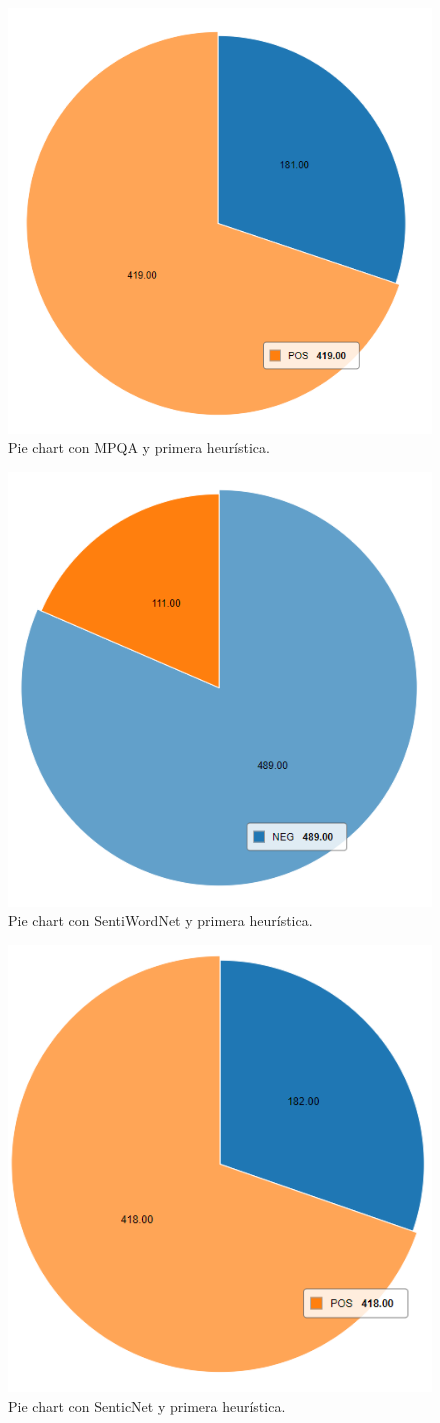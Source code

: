 \newpage

\begin{figure}[H]
    \center\includegraphics[height=.4\linewidth]{img/analysis/pie1.png}
    \caption{Pie chart con MPQA y primera heurística.}
\end{figure}

\begin{figure}[H]
    \center\includegraphics[height=.4\linewidth]{img/analysis/pie2.png}
    \caption{Pie chart con SentiWordNet y primera heurística.}
\end{figure}

\begin{figure}[H]
    \center\includegraphics[height=.4\linewidth]{img/analysis/pie3.png}
    \caption{Pie chart con SenticNet y primera heurística.}
\end{figure}


